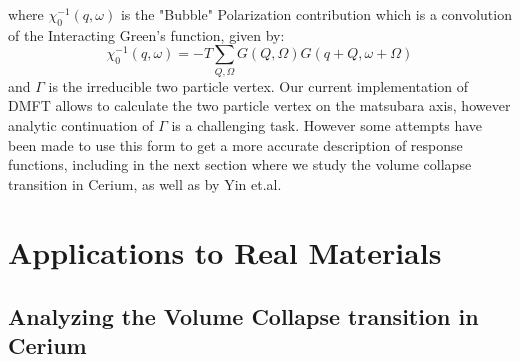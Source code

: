 \documentclass[10pt]{ruthesis}
\begin{document}
{ where $\chi_0^{-1}(q,\omega)$ is the "Bubble" Polarization contribution which is a convolution of the Interacting Green's function, given by:
 \begin{equation}
  \chi_0^{-1}(q,\omega)= -T\sum_{Q,\Omega} G(Q,\Omega) G(q+Q,\omega +\Omega) 
  \end{equation} 
 and $\Gamma $ is the irreducible two particle vertex. Our current implementation of DMFT allows to calculate the two particle vertex on the matsubara axis, however analytic continuation of $\Gamma$ is a challenging task. However some attempts have been made to use this form to get a more accurate description of response functions, including in the next section where we study the volume collapse transition in Cerium, as well as by Yin et.al\cite{Zhipin_Mag}. 
\clearpage
\section{Applications to Real Materials}
\subsection{Analyzing the Volume Collapse transition in Cerium}

}
\end{document}
